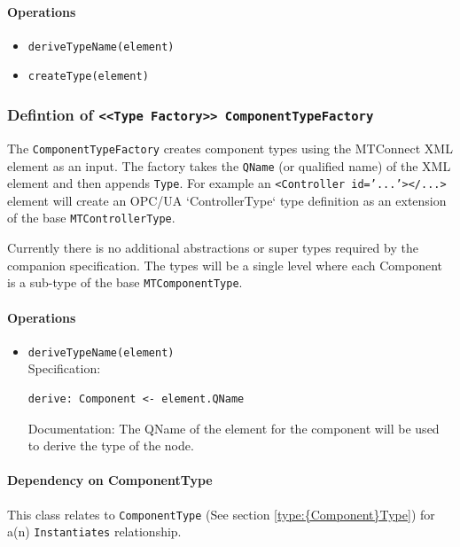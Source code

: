 \paragraph{Operations}
\begin{itemize}
  \item \texttt{deriveTypeName(element)}
  \item \texttt{createType(element)}
\end{itemize}
\FloatBarrier
\subsubsection{Defintion of \texttt{<<Type Factory>> ComponentTypeFactory}} \label{type:ComponentTypeFactory}

\FloatBarrier

The \texttt{ComponentTypeFactory} creates component types using the MTConnect XML element as an input. 
The factory takes the \texttt{QName} (or qualified name) of the XML element and then appends \texttt{Type}. For 
example an \texttt{<Controller id='...'></...>} element will create an OPC/UA `ControllerType` type definition 
as an extension of the base \texttt{MTControllerType}. 

Currently there is no additional abstractions or super types required by the companion specification. 
The types will be a single level where each Component is a sub-type of the base \texttt{MTComponentType}.


\paragraph{Operations}
\begin{itemize}
  \item \texttt{deriveTypeName(element)}\\
    Specification:
   \indent \begin{lstlisting}
derive: Component <- element.QName
\end{lstlisting}

    Documentation: The QName of the element for the component will be used to derive the type of the node.

\end{itemize}
\paragraph{Dependency on {Component}Type}

This class relates to \texttt{{Component}Type} (See section \ref{type:{Component}Type}) for a(n) \texttt{Instantiates} relationship.

